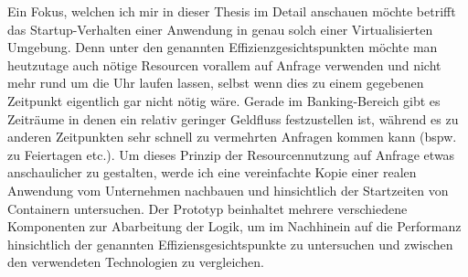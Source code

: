 Ein Fokus, welchen ich mir in dieser Thesis im Detail anschauen möchte betrifft das Startup-Verhalten einer Anwendung in genau solch einer Virtualisierten Umgebung. Denn unter den genannten Effizienzgesichtspunkten möchte man heutzutage auch nötige Resourcen vorallem auf Anfrage verwenden und nicht mehr rund um die Uhr laufen lassen, selbst wenn dies zu einem gegebenen Zeitpunkt eigentlich gar nicht nötig wäre. Gerade im Banking-Bereich gibt es Zeiträume in denen ein relativ geringer Geldfluss festzustellen ist, während es zu anderen Zeitpunkten sehr schnell zu vermehrten Anfragen kommen kann (bspw. zu Feiertagen etc.). Um dieses Prinzip der Resourcennutzung auf Anfrage etwas anschaulicher zu gestalten, werde ich eine vereinfachte Kopie einer realen Anwendung vom Unternehmen nachbauen und hinsichtlich der Startzeiten von Containern untersuchen. Der Prototyp beinhaltet mehrere verschiedene Komponenten zur Abarbeitung der Logik, um im Nachhinein auf die Performanz hinsichtlich der genannten Effiziensgesichtspunkte zu untersuchen und zwischen den verwendeten Technologien zu vergleichen.
